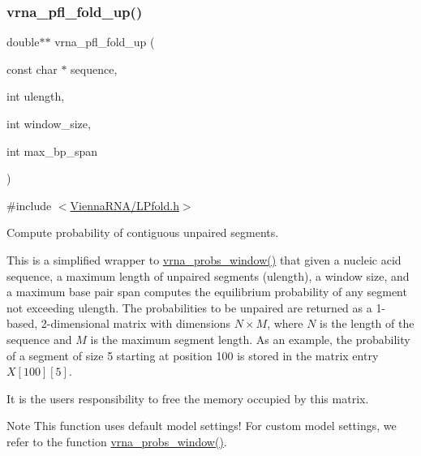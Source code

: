\subsubsection{\texorpdfstring{vrna\+\_\+pfl\+\_\+fold\+\_\+up()}{vrna\_pfl\_fold\_up()}}
{\footnotesize\ttfamily double$\ast$$\ast$ vrna\+\_\+pfl\+\_\+fold\+\_\+up (\begin{DoxyParamCaption}\item[{const char $\ast$}]{sequence,  }\item[{int}]{ulength,  }\item[{int}]{window\+\_\+size,  }\item[{int}]{max\+\_\+bp\+\_\+span }\end{DoxyParamCaption})}



{\ttfamily \#include $<$\hyperlink{LPfold_8h}{Vienna\+R\+N\+A/\+L\+Pfold.\+h}$>$}



Compute probability of contiguous unpaired segments. 

This is a simplified wrapper to \hyperlink{group__local__pf__fold_ga70ec33810fa17a9f67a7c59f156d0137}{vrna\+\_\+probs\+\_\+window()} that given a nucleic acid sequence, a maximum length of unpaired segments ({\ttfamily ulength}), a window size, and a maximum base pair span computes the equilibrium probability of any segment not exceeding {\ttfamily ulength}. The probabilities to be unpaired are returned as a 1-\/based, 2-\/dimensional matrix with dimensions $ N \times M $, where $N$ is the length of the sequence and $M$ is the maximum segment length. As an example, the probability of a segment of size 5 starting at position 100 is stored in the matrix entry $X[100][5]$.

It is the users responsibility to free the memory occupied by this matrix.

\begin{DoxyNote}{Note}
This function uses default model settings! For custom model settings, we refer to the function \hyperlink{group__local__pf__fold_ga70ec33810fa17a9f67a7c59f156d0137}{vrna\+\_\+probs\+\_\+window()}.
\end{DoxyNote}

